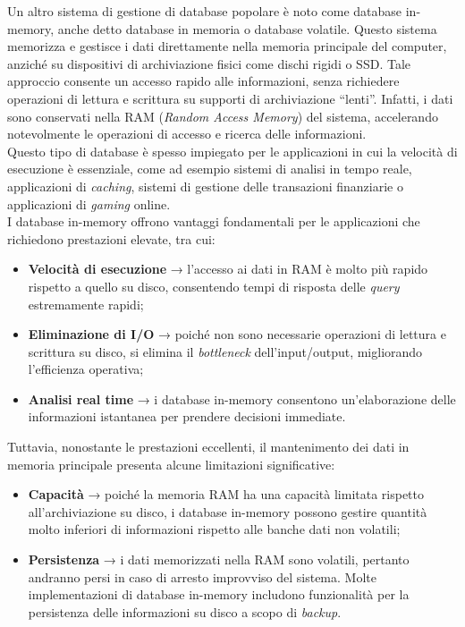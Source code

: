 Un altro sistema di gestione di database popolare è noto come database in-memory, anche detto database in memoria o database volatile. Questo sistema memorizza e gestisce i dati direttamente nella memoria principale del computer, anziché su dispositivi di archiviazione fisici come dischi rigidi o SSD. Tale approccio consente un accesso rapido alle informazioni, senza richiedere operazioni di lettura e scrittura su supporti di archiviazione “lenti”. Infatti, i dati sono conservati nella RAM (\textit{Random Access Memory}) del sistema, accelerando notevolmente le operazioni di accesso e ricerca delle informazioni.\cite{DATABASE_amazon}\\
Questo tipo di database è spesso impiegato per le applicazioni in cui la velocità di esecuzione è essenziale, come ad esempio sistemi di analisi in tempo reale, applicazioni di \textit{caching}, sistemi di gestione delle transazioni finanziarie o applicazioni di \textit{gaming} online.\\
I database in-memory offrono vantaggi fondamentali per le applicazioni che richiedono prestazioni elevate, tra cui:
\begin{itemize}
    \item \textbf{Velocità di esecuzione} → l’accesso ai dati in RAM è molto più rapido rispetto a quello su disco, consentendo tempi di risposta delle \textit{query} estremamente rapidi;
    \item \textbf{Eliminazione di I/O} → poiché non sono necessarie operazioni di lettura e scrittura su disco, si elimina il \textit{bottleneck} dell’input/output, migliorando l’efficienza operativa;
    \item \textbf{Analisi real time} → i database in-memory consentono un’elaborazione delle informazioni istantanea per prendere decisioni immediate.\cite{DATABASE_tibco}
\end{itemize}
Tuttavia, nonostante le prestazioni eccellenti, il mantenimento dei dati in memoria principale presenta alcune limitazioni significative:
\begin{itemize}
    \item \textbf{Capacità} → poiché la memoria RAM ha una capacità limitata rispetto all’archiviazione su disco, i database in-memory possono gestire quantità molto inferiori di informazioni rispetto alle banche dati non volatili;
    \item \textbf{Persistenza} → i dati memorizzati nella RAM sono volatili, pertanto andranno persi in caso di arresto improvviso del sistema. Molte implementazioni di database in-memory includono funzionalità per la persistenza delle informazioni su disco a scopo di \textit{backup}.\cite{DATABASE_tibco}
\end{itemize}

